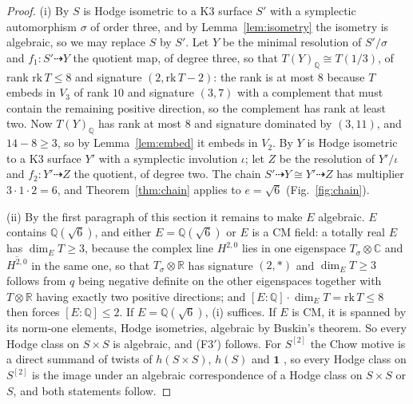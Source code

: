 \documentclass[11pt,reqno]{amsart}
\numberwithin{equation}{section}
\theoremstyle{plain}
\theoremstyle{definition}
\newcommand{\QQ}{\mathbb{Q}}
\newcommand{\RR}{\mathbb{R}}
\newcommand{\CC}{\mathbb{C}}
\newcommand{\Fiii}{\texorpdfstring{\textup{(F3$'$)}}{(F3')}}
\begin{document}
\begin{proof}
(i) By \cite[Prop.~2.11]{Var23} $S$ is Hodge isometric to a K3 surface $S'$ with a symplectic automorphism $\sigma$ of order three, and by Lemma~\ref{lem:isometry} the isometry is algebraic, so we may replace $S$ by $S'$. Let $Y$ be the minimal resolution of $S'/\sigma$ and $f_{1}\colon S'\dashrightarrow Y$ the quotient map, of degree three, so that $T(Y)_{\QQ}\cong T(1/3)$, of rank $\mathrm{rk}\,T\le8$ and signature $(2,\mathrm{rk}\,T-2)$: the rank is at most $8$ because $T$ embeds in $V_{3}$ of rank $10$ and signature $(3,7)$ with a complement that must contain the remaining positive direction, so the complement has rank at least two. Now $T(Y)_{\QQ}$ has rank at most $8$ and signature dominated by $(3,11)$, and $14-8\ge3$, so by Lemma~\ref{lem:embed} it embeds in $V_{2}$. By \cite[Prop.~2.5]{Var23} $Y$ is Hodge isometric to a K3 surface $Y'$ with a symplectic involution $\iota$; let $Z$ be the resolution of $Y'/\iota$ and $f_{2}\colon Y'\dashrightarrow Z$ the quotient, of degree two. The chain $S'\dashrightarrow Y\cong Y'\dashrightarrow Z$ has multiplier $3\cdot1\cdot2=6$, and Theorem~\ref{thm:chain} applies to $e=\sqrt6$ (Fig.~\ref{fig:chain}).

(ii) By the first paragraph of this section it remains to make $E$ algebraic. $E$ contains $\QQ(\sqrt6)$, and either $E=\QQ(\sqrt6)$ or $E$ is a CM field: a totally real $E$ has $\dim_{E}T\ge3$, because the complex line $H^{2,0}$ lies in one eigenspace $T_{\sigma}\otimes\CC$ and $\overline{H^{2,0}}$ in the same one, so that $T_{\sigma}\otimes\RR$ has signature $(2,\ast)$ and $\dim_{E}T\ge3$ follows from $q$ being negative definite on the other eigenspaces together with $T\otimes\RR$ having exactly two positive directions; and $[E:\QQ]\cdot\dim_{E}T=\mathrm{rk}\,T\le8$ then forces $[E:\QQ]\le2$. If $E=\QQ(\sqrt6)$, (i) suffices. If $E$ is CM, it is spanned by its norm-one elements, Hodge isometries, algebraic by Buskin's theorem. So every Hodge class on $S\times S$ is algebraic, and \Fiii{} follows. For $S^{[2]}$ the Chow motive is a direct summand of twists of $h(S\times S)$, $h(S)$ and $\mathbf{1}$ \cite{dCM02}, so every Hodge class on $S^{[2]}$ is the image under an algebraic correspondence of a Hodge class on $S\times S$ or $S$, and both statements follow.


\end{proof}
\end{document}
